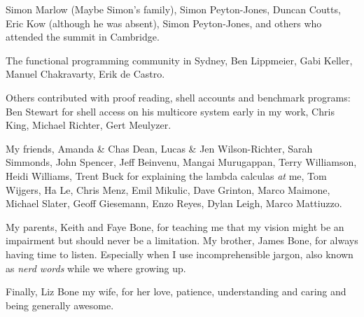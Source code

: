 \documentclass[a4paper,twoside]{report}
\begin{document}
Simon Marlow (Maybe Simon's family),
Simon Peyton-Jones,
Duncan Coutts,
Eric Kow (although he was absent),
Simon Peyton-Jones,
and others who attended the \tscope summit in Cambridge.

The functional programming community in Sydney,
Ben Lippmeier,
Gabi Keller,
Manuel Chakravarty,
Erik de Castro.

Others contributed with proof reading, shell accounts and benchmark
programs:
Ben Stewart for shell access on his multicore system early in my work,
Chris King,
Michael Richter,
Gert Meulyzer.

My friends,
Amanda \& Chas Dean,
Lucas \& Jen Wilson-Richter,
Sarah Simmonds, John Spencer,
Jeff Beinvenu, Mangai Murugappan,
Terry Williamson, Heidi Williams,
Trent Buck for explaining the lambda calculas \emph{at} me,
Tom Wijgers,
Ha Le,
Chris Menz,
Emil Mikulic,
Dave Grinton,
Marco Maimone,
Michael Slater,
Geoff Giesemann,
Enzo Reyes,
Dylan Leigh,
Marco Mattiuzzo.

My parents, Keith and Faye Bone,
for teaching me that my vision might be an impairment but should never
be a limitation.
My brother, James Bone, for always having time to listen.
Especially when I use incomprehensible jargon,
also known as \emph{nerd words} while we where growing up.

Finally, Liz Bone my wife,
for her love, patience, understanding and caring
and being generally awesome.


\tableofcontents

\listoffigures

\listoftables

\listofalgorithms











\end{document}
